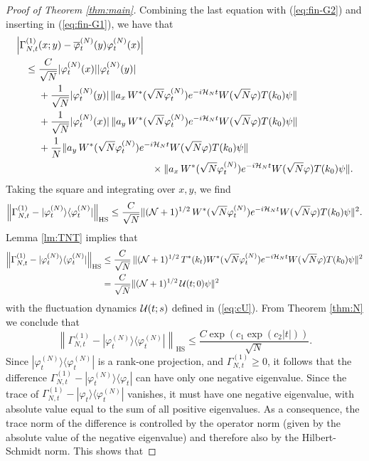 \documentclass[11pt,a4paper]{article}
\newcommand{\cU}{{\cal U}}
\newcommand{\cH}{{\cal H}}
\newcommand{\cN}{{\cal N}}
\begin{document}
\begin{proof}[Proof of Theorem \ref{thm:main}]
Combining the last equation with (\ref{eq:fin-G2}) and inserting in (\ref{eq:fin-G1}), we have that
\[ \begin{split} 
\Big| \Gamma^{(1)}_{N,t} &(x;y) - \overline{\varphi}_t^{(N)} (y) \varphi_t^{(N)} (x) \Big| \\ \leq \; & \frac{C}{\sqrt{N}} |\varphi_t^{(N)} (x)| |\varphi_t^{(N)} (y)| \\ &+ \frac{1}{\sqrt{N}} |\varphi^{(N)}_t (y)| \, \| a_x \, W^* (\sqrt{N} \varphi^{(N)}_t)  e^{-i\cH_N t} W(\sqrt{N} \varphi) T(k_0) \psi  \| \\ &+ \frac{1}{\sqrt{N}} |\varphi^{(N)}_t (x)| \, \| a_y \, W^* (\sqrt{N} \varphi^{(N)}_t)  e^{-i\cH_N t} W(\sqrt{N} \varphi) T(k_0) \psi  \| \\ & + \frac{1}{N} 
 \| a_y \, W^* (\sqrt{N} \varphi^{(N)}_t)  e^{-i\cH_N t} W(\sqrt{N} \varphi) T(k_0) \psi  \|   \\ &\hspace{4cm} \times \| a_x \, W^* (\sqrt{N} \varphi^{(N)}_t)  e^{-i\cH_N t} W(\sqrt{N} \varphi) T(k_0) \psi  \|. \end{split} \] 
Taking the square and integrating over $x,y$, we find
\[ \left\| \Gamma^{(1)}_{N,t} - |\varphi^{(N)}_t \rangle \langle \varphi_t^{(N)}| \right\|_{\text{HS}} \leq \frac{C}{\sqrt{N}} \| (\cN + 1)^{1/2} \,  W^* (\sqrt{N} \varphi^{(N)}_t) e^{-i\cH_N t} W(\sqrt{N} \varphi) T(k_0) \psi \|^2. \]
Lemma \ref{lm:TNT} implies that
\[ \begin{split} \left\| \Gamma^{(1)}_{N,t} - |\varphi^{(N)}_t \rangle \langle \varphi_t^{(N)}| \right\|_{\text{HS}}  \leq \; &\frac{C}{\sqrt{N}} \,  \| (\cN + 1)^{1/2} \, T^* (k_t) W^* (\sqrt{N} \varphi^{(N)}_t) e^{-i\cH_N t} W(\sqrt{N} \varphi) T(k_0) \psi \|^2 \\ =\; &\frac{C}{\sqrt{N}} \| (\cN + 1)^{1/2} \, \cU (t;0) \psi \|^2  
\end{split}\]
with the fluctuation dynamics $\cU (t;s)$ defined in (\ref{eq:cU}).
{F}rom Theorem \ref{thm:N} we conclude that
\[ \left\| \Gamma^{(1)}_{N,t} - |\varphi^{(N)}_t \rangle \langle \varphi_t^{(N)}| \right\|_{\text{HS}} \leq \frac{C\exp (c_1 \exp (c_2 |t|))}{\sqrt{N}}. \]
Since $|\varphi^{(N)}_t\rangle \langle \varphi^{(N)}_t|$ is a rank-one projection, and $\Gamma_{N,t}^{(1)} \geq 0$, it follows that the difference $\Gamma_{N,t}^{(1)} - |\varphi^{(N)}_t \rangle \langle \varphi_t|$ can have only  one negative eigenvalue. Since the trace of $\Gamma_{N,t}^{(1)} - |\varphi_t \rangle \langle \varphi^{(N)}_t|$ vanishes, it must have one negative eigenvalue, with absolute value equal to the sum of all positive eigenvalues. As a consequence, the trace norm of the difference is controlled by the operator norm (given by the absolute value of the negative eigenvalue) and therefore also by the Hilbert-Schmidt norm. This shows that

\end{proof}
\end{document}

